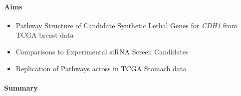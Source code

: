 
\clearpage

\iffalse

\paragraph{Aims}

  \begin{itemize}
   \item Pathway Structure of Candidate Synthetic Lethal Genes for \textit{\textit{CDH1}} from \gls{TCGA} breast data
   
   \bigskip
   
   \item Comparisons to Experimental \gls{siRNA} Screen Candidates
   
   \bigskip
   
   \item Replication of Pathways across in \gls{TCGA} Stomach data
  \end{itemize}

\paragraph{Summary}

